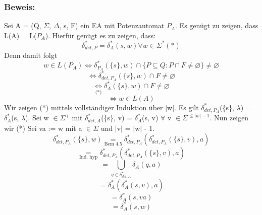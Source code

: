 \subsubsection*{Beweis:} 
Sei A = (Q, $\Sigma$, $\Delta$, s, F) ein EA mit Potenzautomat $P_{A}$. Es genügt zu zeigen, dass L(A) = L($P_{A}$). Hierfür genügt es zu zeigen, dass:
\[\delta_{det,P}^{*} = \delta_{A}^{*}(s, w) \forall w \in \Sigma^{*} (*)\]
Denn damit folgt
\[w \in  L (P_{A}) \Leftrightarrow \delta_{P_{A}}^{*}(\{s\}, w) \cap \{P\subseteq Q : P\cap F \neq \varnothing \} \neq \varnothing \] 
\[\Leftrightarrow \delta_{det, P_{A}}^{*}(\{s\}, w) \cap F \neq \varnothing \]
\[\underset{\text{(*)}}{\Leftrightarrow } \delta_{A}^{*}(\{s\}, w) \cap F \neq \varnothing \]
\[\Leftrightarrow w \in L(A)\] Wir zeigen (*) mittels vollständiger Induktion über $\lvert$w$\rvert$. Es gilt $\delta_{det, P_{A}}^{*}$(\{s\}, $\lambda$) = $\delta_{A}^{*}$(s, $\lambda$). Sei w $\in \Sigma^{+}$ mit $\delta_{det, A}^{*}$(\{s\}, v) = $\delta_{A}^{*}$(s, v) $\forall$ v $\in \Sigma^{\leq \lvert w \rvert - 1}$. Nun zeigen wir (*) Sei va := w mit a $\in \Sigma$ und $\lvert$v$\rvert$ = $\lvert$w$\rvert$ - 1.
\[\delta_{det, P_{A}}^{*} (\{s\}, w) \underset{\text{Bem 4.5}}{=} \delta_{det, P_{A}}^{*} (\delta_{det, P_{A}}^{*}(\{s\}, v), a)\]
\[\underset{\text{Ind. hyp}}{=} \delta_{det, P_{A}}^{*}(\delta_{det, P_{A}}^{*}(\{s\}, v), a)\]
\[ = \bigcup \limits_{q \in \delta_{det, A}^{*}}\delta_{A}(q, a)\]
\[ = \delta_{A}^{*}(\delta_{A}^{*}(s, v), a)\]
\[ = \delta_{A}^{*}(s, va)\]
\[ = \delta_{A}^{*}(s, w)\]
